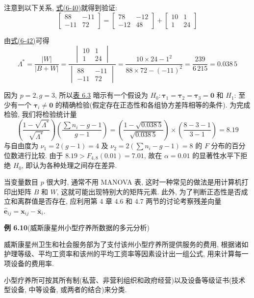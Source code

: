 注意到以下关系, \hyperref[eq:6-40]{式(6-40)}就得到验证:
\[
\begin{bmatrix}88&-11\\-11&72\end{bmatrix}
=\begin{bmatrix}78&-12\\-12&48\end{bmatrix}
+\begin{bmatrix}10&1\\1&24\end{bmatrix}
\]

由\hyperref[eq:6-42]{式(6-42)}可得
\[
\Lambda^*=\frac{|W|}{|B+W|}
=\frac{\begin{vmatrix}10&1\\1&24\end{vmatrix}}{\begin{vmatrix}88&-11\\-11&72\end{vmatrix}}
=\frac{10\times24-1^2}{88\times72-(-11)^2}=\frac{239}{6\,215}=0.038\,5
\]

因为 $p=2,g=3$, 所以\hyperref[tab:6.3]{表 6.3} 暗示有一个假设为 $H_0:\boldsymbol{\tau}_1=\boldsymbol{\tau}_2=\boldsymbol{\tau}_3=\mathbf{0}$ 和 $H_1$: 至少有一个 $\boldsymbol{\tau}_i\neq\mathbf{0}$ 的精确检验(假定存在正态性和各组协方差阵相等的条件). 为完成检验, 我们将检验统计量
\[
\left(\frac{1-\sqrt{\Lambda^*}}{\sqrt{\Lambda^*}}\right)\left(\frac{\sum n_i-g-1}{g-1}\right)
=\left(\frac{1-\sqrt{0.038\,5}}{\sqrt{0.038\,5}}\right)\times\left(\frac{8-3-1}{3-1}\right)=8.19
\]
与自由度为 $\nu_1=2(g-1)=4$ 及 $\nu_2=2\left(\sum n_i-g-1\right)=8$ 的 $F$ 分布的百分位数进行比较. 由于 $8.19>F_{4,8}(0.01)=7.01$, 故在 $\alpha=0.01$ 的显著性水平下拒绝 $H_0$, 即认为各种处理之间存在差异.

当变量数目 $p$ 很大时, 通常不用 MANOVA 表, 这时一种常见的做法是用计算机打印出矩阵 $B$ 和 $W$, 这就可能出现特别大的矩阵元素. 此外, 为了判断正态性是否成立和离群值是否存在, 应利用第 4 章 4.6 和 4.7 两节的讨论考察残差向量 $\hat{\mathbf{e}}_{ij}=\mathbf{x}_{ij}-\bar{\mathbf{x}}_i$.

\noindent\textbf{例 6.10}\quad (威斯康星州小型疗养所数据的多元分析)

威斯康星州卫生和社会服务部为了支付该州小型疗养所提供服务的费用, 根据诸如护理等级、平均工资率和该州的平均工资率等因素设计出一组公式, 用来计算每一项设备的费用率.

小型疗养所可按其所有制(私营、非营利组织和政府经营)以及设备等级证书(技术型设备, 中等设备, 或两者的结合)来分类.

